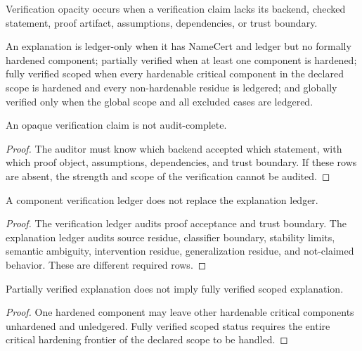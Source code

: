 \begin{definition}
\label{def:philosophy-verification-opacity}
Verification opacity occurs when a verification claim lacks its backend,
checked statement, proof artifact, assumptions, dependencies, or trust
boundary.
\end{definition}

\begin{definition}
\label{def:philosophy-interpretability-verification-grade}
An explanation is ledger-only when it has NameCert and ledger but no
formally hardened component; partially verified when at least one
component is hardened; fully verified scoped when every hardenable
critical component in the declared scope is hardened and every
non-hardenable residue is ledgered; and globally verified only when the
global scope and all excluded cases are ledgered.
\end{definition}

\begin{theorem}
\label{thm:philosophy-verification-opacity-blocks-audit-completeness}
An opaque verification claim is not audit-complete.
\end{theorem}
\begin{proof}
The auditor must know which backend accepted which statement, with which
proof object, assumptions, dependencies, and trust boundary. If these
rows are absent, the strength and scope of the verification cannot be
audited.
\end{proof}

\begin{theorem}
\label{thm:philosophy-component-verification-ledger-not-explanation-ledger}
A component verification ledger does not replace the explanation ledger.
\end{theorem}
\begin{proof}
The verification ledger audits proof acceptance and trust boundary. The
explanation ledger audits source residue, classifier boundary, stability
limits, semantic ambiguity, intervention residue, generalization residue,
and not-claimed behavior. These are different required rows.
\end{proof}

\begin{theorem}
\label{thm:philosophy-partial-verification-not-scoped-full}
Partially verified explanation does not imply fully verified scoped
explanation.
\end{theorem}
\begin{proof}
One hardened component may leave other hardenable critical components
unhardened and unledgered. Fully verified scoped status requires the
entire critical hardening frontier of the declared scope to be handled.
\end{proof}

